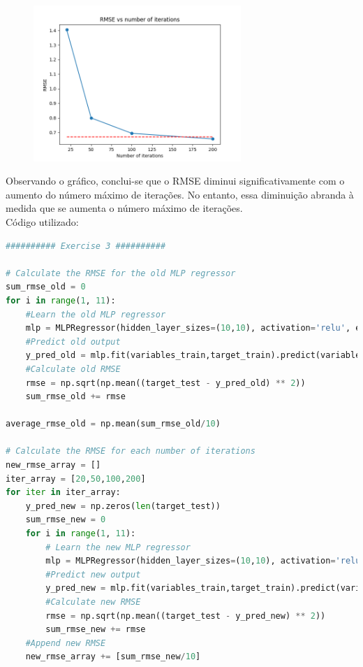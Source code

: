 \documentclass[a4paper,12pt]{article} %
\begin{document}
\begin{enumerate}
\begin{figure}[H]
\centering
\includegraphics[width=0.7\textwidth]{ex3_rmse.png}
\end{figure}

Observando o gráfico, conclui-se que o RMSE diminui significativamente com o aumento do número máximo de iterações.
No entanto, essa diminuição abranda à medida que se aumenta o número máximo de iterações.\\

Código utilizado:

\begin{lstlisting}[language=Python]
########## Exercise 3 ##########

# Calculate the RMSE for the old MLP regressor
sum_rmse_old = 0
for i in range(1, 11):
    #Learn the old MLP regressor
    mlp = MLPRegressor(hidden_layer_sizes=(10,10), activation='relu', early_stopping=True, validation_fraction=0.2, random_state=i)
    #Predict old output
    y_pred_old = mlp.fit(variables_train,target_train).predict(variables_test)
    #Calculate old RMSE
    rmse = np.sqrt(np.mean((target_test - y_pred_old) ** 2))
    sum_rmse_old += rmse

average_rmse_old = np.mean(sum_rmse_old/10)

# Calculate the RMSE for each number of iterations
new_rmse_array = []
iter_array = [20,50,100,200]
for iter in iter_array:
    y_pred_new = np.zeros(len(target_test))
    sum_rmse_new = 0
    for i in range(1, 11):
        # Learn the new MLP regressor 
        mlp = MLPRegressor(hidden_layer_sizes=(10,10), activation='relu', max_iter = iter, random_state=i)
        #Predict new output
        y_pred_new = mlp.fit(variables_train,target_train).predict(variables_test)
        #Calculate new RMSE
        rmse = np.sqrt(np.mean((target_test - y_pred_new) ** 2))
        sum_rmse_new += rmse
    #Append new RMSE
    new_rmse_array += [sum_rmse_new/10]


\end{lstlisting}
\end{enumerate}
\end{document}
